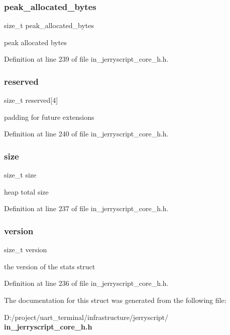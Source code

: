 \mbox{\label{structjerry__heap__stats__t_a2747d371bcd08288243b4813ec50af2b}} 
\subsubsection{peak\_allocated\_bytes}
{\footnotesize\ttfamily size\+\_\+t peak\+\_\+allocated\+\_\+bytes}

peak allocated bytes 

Definition at line 239 of file in\+\_\+jerryscript\+\_\+core\+\_\+h.\+h.

\mbox{\label{structjerry__heap__stats__t_a4f4283dc17d5676973293201afbf3307}} 
\subsubsection{reserved}
{\footnotesize\ttfamily size\+\_\+t reserved[4]}

padding for future extensions 

Definition at line 240 of file in\+\_\+jerryscript\+\_\+core\+\_\+h.\+h.

\mbox{\label{structjerry__heap__stats__t_a854352f53b148adc24983a58a1866d66}} 
\subsubsection{size}
{\footnotesize\ttfamily size\+\_\+t size}

heap total size 

Definition at line 237 of file in\+\_\+jerryscript\+\_\+core\+\_\+h.\+h.

\mbox{\label{structjerry__heap__stats__t_add408e6820197212a604cd943f5a6170}} 
\subsubsection{version}
{\footnotesize\ttfamily size\+\_\+t version}

the version of the stats struct 

Definition at line 236 of file in\+\_\+jerryscript\+\_\+core\+\_\+h.\+h.



The documentation for this struct was generated from the following file\+:\begin{DoxyCompactItemize}
\item 
D\+:/project/uart\+\_\+terminal/infrastructure/jerryscript/\textbf{ in\+\_\+jerryscript\+\_\+core\+\_\+h.\+h}\end{DoxyCompactItemize}
